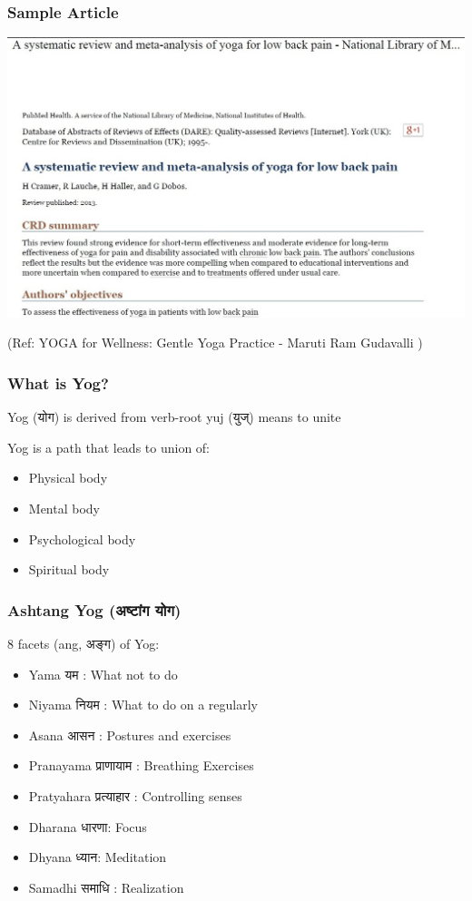 \begin{frame}[fragile]\frametitle{Sample Article}

\begin{center}
\includegraphics[width=0.8\linewidth,keepaspectratio]{images/yog18}
\end{center}

\tiny{(Ref: YOGA for Wellness: Gentle Yoga Practice - Maruti Ram Gudavalli )}


\end{frame}



\begin{frame}[fragile]\frametitle{What is Yog?}

Yog (योग) is derived from verb-root yuj (युज्) means to unite

Yog is a path that leads to union of:
	\begin{itemize}
	\item Physical body
	\item Mental body
	\item Psychological body
	\item Spiritual body
	\end{itemize}

\end{frame}

\begin{frame}[fragile]\frametitle{Ashtang Yog (अष्टांग योग)}
8 facets (ang, अङ्ग) of Yog:
	\begin{itemize}
	\item Yama यम : What not to do
	\item Niyama नियम : What to do on a regularly
	\item Asana आसन : Postures and exercises
	\item Pranayama प्राणायाम : Breathing Exercises
	\item Pratyahara प्रत्याहार : Controlling senses
	\item Dharana धारणा: Focus
	\item Dhyana ध्यान: Meditation
	\item Samadhi समाधि :  Realization

	\end{itemize}

\end{frame}

